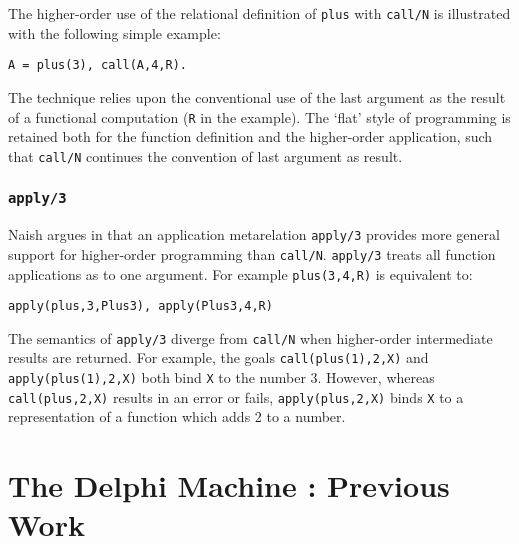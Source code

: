 The higher-order use of the relational definition of \texttt{plus} with \texttt{call/N}
is illustrated with the following simple example:
\begin{verbatim}
A = plus(3), call(A,4,R).
\end{verbatim}
The technique relies upon the conventional use of the last argument as the result of 
a functional computation (\texttt{R} in the example).  The `flat' style of 
programming is retained both for the function definition and the higher-order
application, such that \texttt{call/N} continues the convention of last argument as
result.

\subsubsection{\texttt{apply/3}}

Naish argues in \cite{Nai96} that an application metarelation \texttt{apply/3} provides
more general support for higher-order programming than \texttt{call/N}.  \texttt{apply/3}
treats all function applications as to one argument.  For example \texttt{plus(3,4,R)} is
equivalent to:
\begin{verbatim}
apply(plus,3,Plus3), apply(Plus3,4,R)
\end{verbatim}

The semantics of \texttt{apply/3} diverge from \texttt{call/N} when
higher-order intermediate results are returned.  For example, the goals
\texttt{call(plus(1),2,X)} and \texttt{apply(plus(1),2,X)} both bind \texttt{X} to
the number 3.  However, whereas \texttt{call(plus,2,X)} results in an error or
fails, \texttt{apply(plus,2,X)} binds \texttt{X} to a representation of a function
which adds 2 to a number.

\section{The Delphi Machine : Previous Work} %
\label{delphi_machine_pwork}

